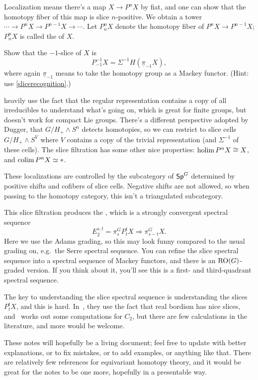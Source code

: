 Localization means there's a map $X\to P^nX$ by fiat, and one can show that the homotopy fiber of this map is slice
$n$-positive. We obtain a tower $\dotsb\to P^nX\to P^{n-1}X\to \dotsb$. Let $P_n^nX$ denote the homotopy fiber of
$P^nX\to P^{n-1}X$; $P_n^nX$ is called the  of $X$.
\begin{ex}
Show that the $-1$-slice of $X$ is
\[P_{-1}^{-1}X = \Sigma^{-1} H(\underline\pi_{-1}X),\]
where again $\underline\pi_{-1}$ means to take the homotopy group as a Mackey functor. (Hint: use
\cref{slicerecognition}.)
\end{ex}
\cite{HHR} heavily use the fact that the regular
representation contains a copy of all irreducibles to understand what's going on, which is great for finite groups,
but doesn't work for compact Lie groups. There's a different perspective adopted by Dugger, that $G/H_+\wedge S^n$
detects homotopies, so we can restrict to slice cells $G/H_+\wedge S^V$ where $V$ contains a copy of the trivial
representation (and $\Sigma^{-1}$ of these cells). The slice filtration has some other nice properties: $\operatorname*{holim}
P^nX\cong X$, and $\operatorname*{colim} P^nX\simeq *$.

These localizations are controlled by the subcategory of $\mathsf{Sp}^G$ determined by positive shifts and cofibers of
slice cells. Negative shifts are not allowed, so when passing to the homotopy category, this isn't a triangulated
subcategory.

This slice filtration produces the , which is a strongly convergent spectral sequence
\begin{equation}
\label{SlSS}
E_2^{s,t} = \pi_s^G P_t^tX\Longrightarrow \pi_{s-t}^G X.
\end{equation}
Here we use the Adams grading, so this may look funny compared to the usual grading on, e.g.\ the Serre spectral
sequence. You can refine the slice spectral sequence into a spectral sequence of Mackey functors, and there is an
$\mathrm{RO}(G)$-graded version. If you think about it, you'll see this is a first- and third-quadrant spectral
sequence.

The key to understanding the slice spectral sequence is understanding the slices $P_t^tX$, and this is hard.
In~\cite{HHR}, they use the fact that real bordism has nice slices, and~\cite{DuggerKR} works out some computations
for $C_2$, but there are few calculations in the literature, and more would be welcome.
%

These notes will hopefully be a living document; feel free to update with better explanations, or to fix mistakes,
or to add examples, or anything like that. There are relatively few references for equivariant homotopy theory, and
it would be great for the notes to be one more, hopefully in a presentable way.
